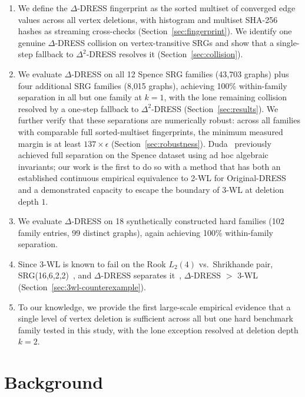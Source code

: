 \documentclass[11pt,a4paper]{article}
\begin{document}
\begin{enumerate}
    \item We define the $\Delta$-DRESS fingerprint as the sorted multiset of converged edge values across all vertex deletions, with histogram and multiset SHA-256 hashes as streaming cross-checks (Section~\ref{sec:fingerprint}).  We identify one genuine $\Delta$-DRESS collision on vertex-transitive SRGs and show that a single-step fallback to $\Delta^2$-DRESS resolves it (Section~\ref{sec:collision}).

    \item We evaluate $\Delta$-DRESS on all 12 Spence SRG families (43{,}703 graphs) plus four additional SRG families (8{,}015 graphs), achieving 100\% within-family separation in all but one family at $k=1$, with the lone remaining collision resolved by a one-step fallback to $\Delta^2$-DRESS (Section~\ref{sec:results}).  We further verify that these separations are numerically robust: across all families with comparable full sorted-multiset fingerprints, the minimum measured margin is at least $137 \times \epsilon$ (Section~\ref{sec:robustness}).
    Duda~\cite{duda2024simple} previously achieved full separation on the Spence dataset using ad hoc algebraic invariants; our work is the first to do so with a method that has both an established continuous empirical equivalence to 2-WL for Original-DRESS and a demonstrated capacity to escape the boundary of 3-WL at deletion depth $1$.

    \item We evaluate $\Delta$-DRESS on 18 synthetically constructed hard families (102 family entries, 99 distinct graphs), again achieving 100\% within-family separation.

    \item Since 3-WL is known to fail on the Rook $L_2(4)$ vs.\ Shrikhande pair, SRG(16,6,2,2)~\cite{cai1992optimal}, and $\Delta$-DRESS separates it~\cite{castrillo2026dress}, $\Delta$-DRESS $>$ 3-WL (Section~\ref{sec:3wl-counterexample}).

    \item To our knowledge, we provide the first large-scale empirical evidence that a single level of vertex deletion is sufficient across all but one hard benchmark family tested in this study, with the lone exception resolved at deletion depth $k=2$.
\end{enumerate}


\section{Background}
\end{document}
